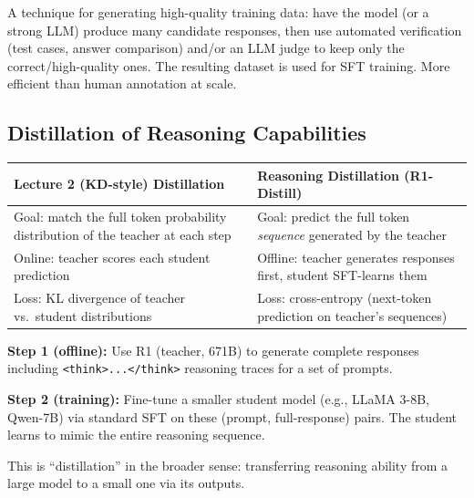 \documentclass[11pt, a4paper]{article}
\begin{document}
\begin{defbox}
A technique for generating high-quality training data: have the model (or a strong LLM) produce many candidate responses, then use automated verification (test cases, answer comparison) and/or an LLM judge to keep only the correct/high-quality ones. The resulting dataset is used for SFT training. More efficient than human annotation at scale.
\end{defbox}

\subsection{Distillation of Reasoning Capabilities}

\begin{defbox}
\begin{center}
\begin{tabular}{@{}p{5cm}p{7cm}@{}}
\toprule
\textbf{Lecture 2 (KD-style) Distillation} & \textbf{Reasoning Distillation (R1-Distill)} \\
\midrule
Goal: match the full token probability distribution of the teacher at each step & Goal: predict the full token \emph{sequence} generated by the teacher \\
Online: teacher scores each student prediction & Offline: teacher generates responses first, student SFT-learns them \\
Loss: KL divergence of teacher vs.\ student distributions & Loss: cross-entropy (next-token prediction on teacher's sequences) \\
\bottomrule
\end{tabular}
\end{center}
\end{defbox}

\begin{defbox}
\textbf{Step 1 (offline):} Use R1 (teacher, 671B) to generate complete responses including \texttt{<think>...</think>} reasoning traces for a set of prompts.

\textbf{Step 2 (training):} Fine-tune a smaller student model (e.g., LLaMA 3-8B, Qwen-7B) via standard SFT on these (prompt, full-response) pairs. The student learns to mimic the entire reasoning sequence.

This is ``distillation'' in the broader sense: transferring reasoning ability from a large model to a small one via its outputs.
\end{defbox}
\end{document}
